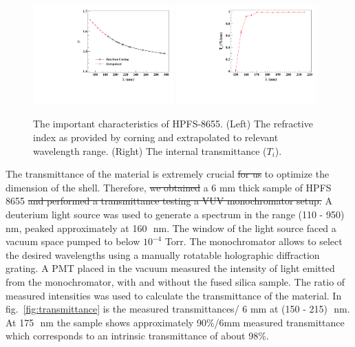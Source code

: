 \begin{figure}
   \centering
   \includegraphics[width=0.48\textwidth]{RI-calibration.pdf}
    \includegraphics[width=0.48\textwidth]{IntTransmittance.pdf}
   \caption{The important characteristics of HPFS-8655. (Left) The refractive index as provided by corning and 
   extrapolated to relevant wavelength range. (Right) The internal transmittance ($T_{i}$).} 
   \label{fig:hpfsRIcalibration}
\end{figure}

The transmittance of the material is extremely crucial \sout{for us} to optimize the dimension of the shell. Therefore, \sout{we obtained} a 6 mm 
thick sample of HPFS 8655  \sout{and performed a transmittance testing a VUV monochromator setup.} 
A deuterium light source was used to generate a spectrum in the range (110 - 950)~\,nm, peaked approximately at 160~\,nm. The window of the light source faced a vacuum space pumped to below $10^{-4}$ Torr. The monochromator allows to select the desired wavelengths using a manually rotatable holographic diffraction grating. A PMT placed in the vacuum measured the intensity of light emitted from the monochromator, with and without the fused silica sample. The ratio of measured intensities was used to calculate the transmittance of the material. In fig.~\ref{fig:transmittance} is the measured transmittances/ 6 mm at (150 - 215)~\,nm. At 175~\,nm the sample shows approximately 90\%/6mm measured transmittance which corresponds to an intrinsic transmittance of about 98\%.  



